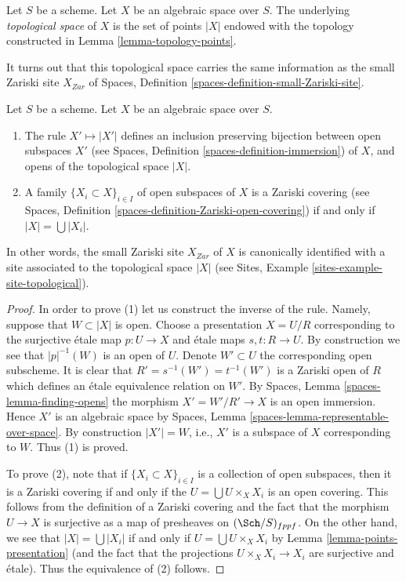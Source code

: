\begin{definition}
\label{definition-topological-space}
Let $S$ be a scheme. Let $X$ be an algebraic space over $S$.
The underlying {\it topological space} of $X$ is the set of points
$|X|$ endowed with the topology constructed in
Lemma \ref{lemma-topology-points}.
\end{definition}

\noindent
It turns out that this topological space carries the same information
as the small Zariski site $X_{Zar}$ of
Spaces, Definition \ref{spaces-definition-small-Zariski-site}.

\begin{lemma}
\label{lemma-open-subspaces}
Let $S$ be a scheme.
Let $X$ be an algebraic space over $S$.
\begin{enumerate}
\item The rule $X' \mapsto |X'|$ defines an inclusion preserving
bijection between open subspaces $X'$ (see
Spaces, Definition \ref{spaces-definition-immersion})
of $X$, and opens of the topological space $|X|$.
\item A family $\{X_i \subset X\}_{i \in I}$ of open subspaces of $X$
is a Zariski covering (see
Spaces, Definition \ref{spaces-definition-Zariski-open-covering})
if and only if $|X| = \bigcup |X_i|$.
\end{enumerate}
In other words, the small Zariski site $X_{Zar}$ of $X$ is canonically
identified with a site associated to the topological space $|X|$ (see
Sites, Example \ref{sites-example-site-topological}).
\end{lemma}

\begin{proof}
In order to prove (1) let us construct the inverse of the rule.
Namely, suppose that $W \subset |X|$ is open. Choose a presentation
$X = U/R$ corresponding to the surjective \'etale map
$p : U \to X$ and \'etale maps $s, t : R \to U$.
By construction we see that $|p|^{-1}(W)$ is an
open of $U$. Denote $W' \subset U$ the corresponding open subscheme.
It is clear that $R' = s^{-1}(W') = t^{-1}(W')$ is a Zariski open
of $R$ which defines an \'etale equivalence relation on $W'$.
By Spaces, Lemma \ref{spaces-lemma-finding-opens} the morphism
$X' = W'/R' \to X$ is an open immersion. Hence $X'$ is an algebraic space
by Spaces, Lemma \ref{spaces-lemma-representable-over-space}.
By construction $|X'| = W$, i.e., $X'$ is a subspace of $X$
corresponding to $W$. Thus (1) is proved.

\medskip\noindent
To prove (2), note that if $\{X_i \subset X\}_{i \in I}$ is a collection
of open subspaces, then it is a Zariski covering if and only if the
$U = \bigcup U \times_X X_i$ is an open covering. This follows from
the definition of a Zariski covering and the fact that the morphism
$U \to X$ is surjective as a map of presheaves on $(\Sch/S)_{fppf}$.
On the other hand, we see that $|X| = \bigcup |X_i|$ if and only if
$U = \bigcup U \times_X X_i$ by Lemma \ref{lemma-points-presentation}
(and the fact that the projections $U \times_X X_i \to X_i$ are surjective
and \'etale). Thus the equivalence of (2) follows.
\end{proof}


